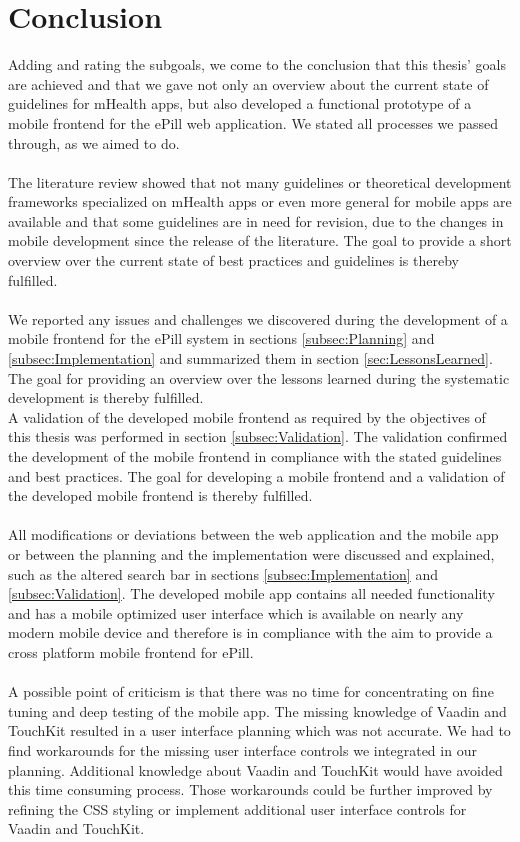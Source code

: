 \section{Conclusion}
Adding and rating the subgoals, we come to the conclusion that this thesis' goals are achieved and that we gave not only an overview about the current state of guidelines for mHealth apps, but also developed a functional prototype of a mobile frontend for the ePill web application. We stated all processes we passed through, as we aimed to do. 
\\
\\
The literature review showed that not many guidelines or theoretical development frameworks specialized on mHealth apps or even more general for mobile apps are available and that some guidelines are in need for revision, due to the changes in mobile development since the release of the literature. The goal to provide a short overview over the current state of best practices and guidelines is thereby fulfilled.
\\
\\
We reported any issues and challenges we discovered during the development of a mobile frontend for the ePill system in sections \ref{subsec:Planning} and \ref{subsec:Implementation} and summarized them in section \ref{sec:LessonsLearned}. The goal for providing an overview over the lessons learned during the systematic development is thereby fulfilled. 
\\
A validation of the developed mobile frontend as required by the objectives of this thesis was performed in section \ref{subsec:Validation}. The validation confirmed the development of the mobile frontend in compliance with the stated guidelines and best practices. The goal for developing a mobile frontend and a validation of the developed mobile frontend is thereby fulfilled.
\\
\\
All modifications or deviations between the web application and the mobile app or between the planning and the implementation were discussed and explained, such as the altered search bar in sections \ref{subsec:Implementation} and \ref{subsec:Validation}. The developed mobile app contains all needed functionality and has a mobile optimized user interface which is available on nearly any modern mobile device and therefore is in compliance with the aim to provide a cross platform mobile frontend for ePill.
\\
\\
A possible point of criticism is that there was no time for concentrating on fine tuning and deep testing of the mobile app. The missing knowledge of Vaadin and TouchKit resulted in a user interface planning which was not accurate. We had to find workarounds for the missing user interface controls we integrated in our planning. Additional knowledge about Vaadin and TouchKit would have avoided this time consuming process. Those workarounds could be further improved by refining the CSS styling or implement additional user interface controls for Vaadin and TouchKit.
